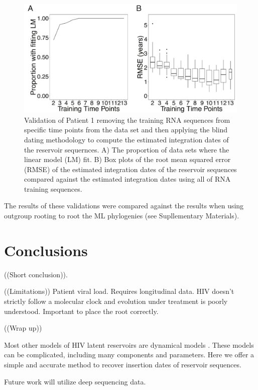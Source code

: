 \documentclass[12pt,onecolumn,twoside]{pnas-new}
\begin{document}
\begin{figure}
\includegraphics[width=\textwidth{}]{sensitivity}
\caption{Validation of Patient 1 removing the training RNA sequences from specific time points from the data set and then applying the blind dating methodology to compute the estimated integration dates of the reservoir sequernces.
A) The proportion of data sets where the linear model (LM) fit.
B) Box plots of the root mean squared error (RMSE) of the estimated integration dates of the reservoir sequences compared against the estimated integration dates using all of RNA training sequences.}
\label{fig:validationdna}
\end{figure}

The results of these validations were compared against the results when using outgroup rooting to root the ML phylogenies (see Supllementary Materials).

\section*{Conclusions}
((Short conclusion)).

((Limitations))
Patient viral load.
Requires longitudinal data.
HIV doesn't strictly follow a molecular clock and evolution under treatment is poorly understood.
Important to place the root correctly.

((Wrap up))

Most other models of HIV latent reservoirs are dynamical models \cite{Rong09,Pace11}.
These models can be complicated, including many components and parameters.
Here we offer a simple and accurate method to recover insertion dates of reservoir sequences.

Future work will utilize deep sequencing data.
\end{document}
